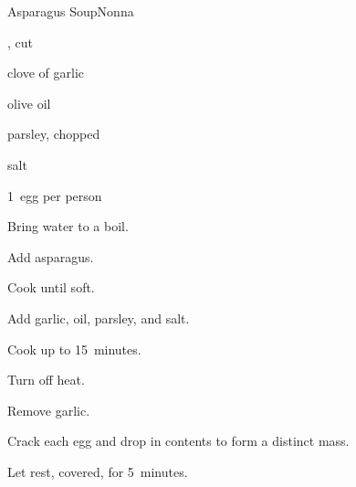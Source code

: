 \begin{recipe}{Asparagus Soup}{Nonna}{}

\begin{ingredients}
\item {}, cut
\item clove of garlic
\item olive oil
\item parsley, chopped
\item salt
\item 1~egg per person
\end{ingredients}

\begin{directions}
\item Bring water to a boil.
\item Add asparagus.
\item Cook until soft.
\item Add garlic, oil, parsley, and salt.
\item Cook up to 15~minutes.
\item Turn off heat.
\item Remove garlic.
\item Crack each egg and drop in contents to form a distinct mass.
\item Let rest, covered, for 5~minutes.
\end{directions}

\end{recipe}
